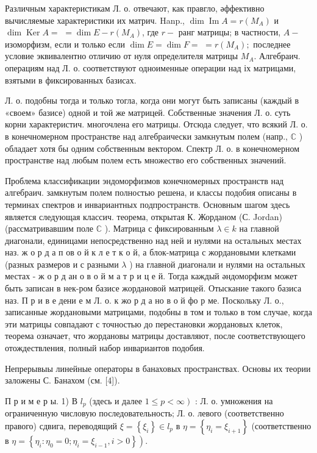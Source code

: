 \documentclass[10pt]{article}
\begin{document}
Различным характеристикам Л. о. отвечают, как правгло, әффективно вычисляемые характеристики их матрич. Hanp., $\operatorname{dim} \operatorname{Im} A=r\left(M_{A}\right)$ и $\operatorname{dim} \operatorname{Ker} A=$ $=\operatorname{dim} E-r\left(M_{A}\right)$, где $r-$ ранг матрицы; в частности, $A-$ изоморфизм, если и только если $\operatorname{dim} E=\operatorname{dim} F=$ $=r\left(M_{A}\right) ;$ последнее условие эквивалентно отличию от нуля определителя матрицы $M_{A}$. Алгебраич. операциям над Л. о. соответствуют одноименные операции над іх матрицами, взятыми в фиксированных базисах.



Л. о. подобны тогда и только тогла, когда они могут быть записаны (каждый в «своем» базисе) одной и той же матрицей. Собственные значения Л. о. суть корни характеристич. многочлена его матрицы. Отсюда следует, что всякий Л. о. в конечномерном пространстве над алгебраически замкнутым полем (напр., $\mathbb{C}$ ) обладает хотя бы одним собственным вектором. Спектр Л. о. в конечномерном пространстве над любым полем есть множество его собственных значений.



Проблема классификации эндоморфизмов конечномерных пространств над алгебраич. замкнутым полем полностью решена, и классы подобия описаны в терминах спектров и инвариантных подпространств. Основным шагом здесь является следующая классич. теорема, открытая К. Жорданом (С. Jordan) (рассматривавшим поле $\mathbb{C}$ ). Матрица с фиксированным $\lambda \in k$ на главной диагонали, единицами непосредственно над ней и нулями на остальных местах наз. ж о р д а п ов о й к л е т к о й, а блок-матрица с жордановыми клетками (разных размеров и с разными $\lambda$ ) на главной диагонали и нулями на остальных местах - ж о р д ан о в о й м а т р и ц е й. Тогда каждый әндоморфизм может быть записан в нек-ром базисе жордановой матрицей. Отыскание такого базиса наз. П р и в е дени е м Л. о. к жо р д а но в о й фо р ме. Поскольку Л. о., записанные жордановыми матрицами, подобны в том и только в том случае, когда эти матрицы совпадают с точностью до перестановки жордановых клеток, теорема означает, что жордановы матрицы доставляют, после соответствующего отождествления, полный набор инвариантов подобия.



Непрерывыы линейные операторы в банаховых пространствах. Основы их теории заложены С. Банахом (см. [4]).



П р и м е р ы. 1) В $l_{p}$ (здесь и далее $\left.1 \leqslant p<\infty\right)$ : Л. о. умножения на ограниченную числовую последовательность; Л. о. левого (соответственно правого) сдвига, переводящий $\xi=\left\{\xi_{i}\right\} \in l_{p}$ в $\eta=\left\{\eta_{i}=\xi_{i+1}\right\}$ (соответственно в $\left.\eta=\left\{\eta_{i}: \eta_{0}=0 ; \eta_{i}=\xi_{i-1}, i>0\right\}\right)$.
\end{document}
